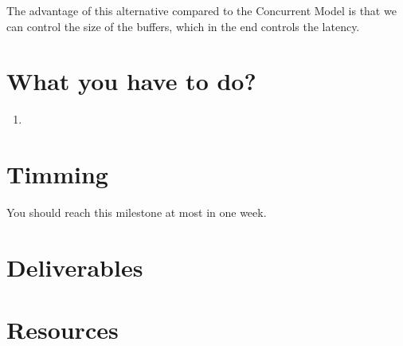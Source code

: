 The advantage of this alternative compared to the Concurrent Model is
that we can control the size of the buffers, which in the end controls the latency.

\section{What you have to do?}

\begin{enumerate}

\item
  
\end{enumerate}

\section{Timming}

You should reach this milestone at most in one week.

\section{Deliverables}

\section{Resources}


